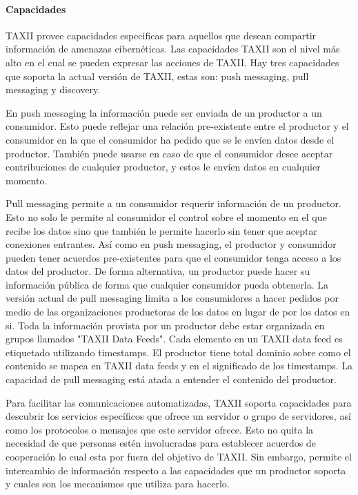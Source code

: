 \paragraph{Capacidades}

TAXII provee capacidades especificas para aquellos que desean compartir 
información de amenazas cibernéticas. Las capacidades TAXII son el nivel más 
alto en el cual se pueden expresar las acciones de TAXII. Hay tres capacidades 
que soporta la actual versión de TAXII, estas son: push messaging, pull 
messaging y discovery.

En push messaging la información puede ser enviada de un productor a un 
consumidor. Esto puede reflejar una relación pre-existente entre el productor y 
el consumidor en la que el consumidor ha pedido que se le envíen datos desde el 
productor. También puede usarse en caso de que el consumidor desee aceptar 
contribuciones de cualquier productor, y estos le envíen datos en cualquier 
momento.

Pull messaging permite a un consumidor requerir información de un productor. 
Esto no solo le permite al consumidor el control sobre el momento en el que 
recibe los datos sino que también le permite hacerlo sin tener que aceptar 
conexiones entrantes. Así como en push messaging, el productor y consumidor 
pueden tener acuerdos pre-existentes para que el consumidor tenga acceso a los 
datos del productor. De forma alternativa, un productor puede hacer su 
información pública de forma que cualquier consumidor pueda obtenerla. La 
versión actual de pull messaging limita a los consumidores a hacer pedidos por 
medio de las organizaciones productoras de los datos en lugar de por los datos 
en si. Toda la información provista por un productor debe estar organizada en 
grupos llamados "TAXII Data Feeds". Cada elemento en un TAXII data feed es 
etiquetado utilizando timestamps. El productor tiene total dominio sobre como el 
contenido se mapea en TAXII data feeds y en el significado de los timestamps. La 
capacidad de pull messaging está atada a entender el contenido del productor.

Para facilitar las comunicaciones automatizadas, TAXII soporta capacidades para 
descubrir los servicios específicos que ofrece un servidor o grupo de 
servidores, así como los protocolos o mensajes que este servidor ofrece. Esto no 
quita la necesidad de que personas estén involucradas para establecer acuerdos de 
cooperación lo cual esta por fuera del objetivo de TAXII. Sin embargo, permite 
el intercambio de información respecto a las capacidades que un productor 
soporta y cuales son los mecanismos que utiliza para hacerlo.

